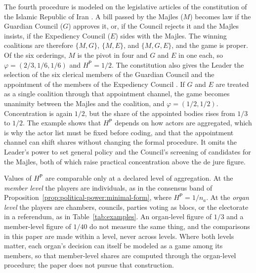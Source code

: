 \documentclass[11pt,letterpaper]{article}
\theoremstyle{definition}
\theoremstyle{remark}
\newcommand{\pP}{\mathsf{P}}
\begin{document}
The fourth procedure is modeled on the legislative articles of the constitution of the Islamic Republic of Iran \citep{iranconst}. A bill passed by the Majles ($M$) becomes law if the Guardian Council ($G$) approves it, or, if the Council rejects it and the Majles insists, if the Expediency Council ($E$) sides with the Majles. The winning coalitions are therefore $\{M,G\}$, $\{M,E\}$, and $\{M,G,E\}$, and the game is proper. Of the six orderings, $M$ is the pivot in four and $G$ and $E$ in one each, so $\varphi=(2/3,1/6,1/6)$ and $H^{\pP}=1/2$. The constitution also gives the Leader the selection of the six clerical members of the Guardian Council and the appointment of the members of the Expediency Council \citep{iranconst}. If $G$ and $E$ are treated as a single coalition through that appointment channel, the game becomes unanimity between the Majles and the coalition, and $\varphi=(1/2,1/2)$. Concentration is again $1/2$, but the share of the appointed bodies rises from $1/3$ to $1/2$. The example shows that $H^{\pP}$ depends on how actors are aggregated, which is why the actor list must be fixed before coding, and that the appointment channel can shift shares without changing the formal procedure. It omits the Leader's power to set general policy and the Council's screening of candidates for the Majles, both of which raise practical concentration above the de jure figure.

Values of $H^{\pP}$ are comparable only at a declared level of aggregation. At the \emph{member level} the players are individuals, as in the consensus band of Proposition~\ref{prop:political-power:minimal-form}, where $H^{\pP}=1/n_a$. At the \emph{organ level} the players are chambers, councils, parties voting as blocs, or the electorate in a referendum, as in Table~\ref{tab:examples}. An organ-level figure of $1/3$ and a member-level figure of $1/40$ do not measure the same thing, and the comparisons in this paper are made within a level, never across levels. Where both levels matter, each organ's decision can itself be modeled as a game among its members, so that member-level shares are computed through the organ-level procedure; the paper does not pursue that construction.
\end{document}
